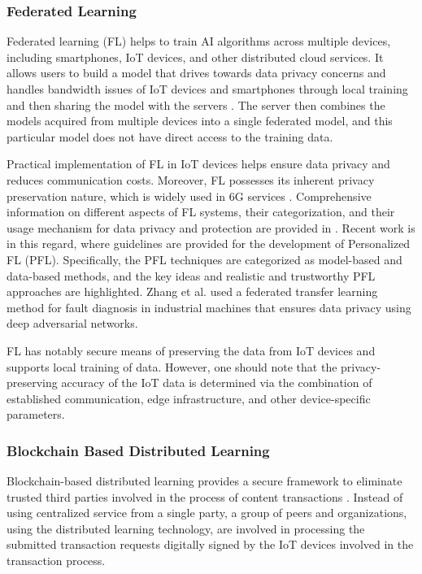 \documentclass[journal]{IEEEtran}
\begin{document}
\subsubsection{Federated Learning} 
Federated learning (FL) helps to train AI algorithms across multiple devices, including smartphones, IoT devices, and other distributed cloud services. It allows users to build a model that drives towards data privacy concerns and handles bandwidth issues of IoT devices and smartphones through local training and then sharing the model with the servers \cite{pham2021uav}. The server then combines the models acquired from multiple devices into a single federated model, and this particular model does not have direct access to the training data. 

Practical implementation of FL in IoT devices helps ensure data privacy and reduces communication costs. Moreover, FL possesses its inherent privacy preservation nature, which is widely used in 6G services \cite{liu2020federated,xiao2020towards}. Comprehensive information on different aspects of FL systems, their categorization, and their usage mechanism for data privacy and protection are provided in \cite{li2019survey}. Recent work is \cite{tan2021towards} in this regard, where guidelines are provided for the development of Personalized FL (PFL). Specifically, the PFL techniques are categorized as model-based and data-based methods, and the key ideas and realistic and trustworthy PFL approaches are highlighted. Zhang et al. \cite{zhang2021federated} used a federated transfer learning method for fault diagnosis in industrial machines that ensures data privacy using deep adversarial networks. 

FL has notably secure means of preserving the data from IoT devices and supports local training of data. However, one should note that the privacy-preserving accuracy of the IoT data is determined via the combination of established communication, edge infrastructure, and other device-specific parameters.    

\subsubsection{Blockchain Based Distributed Learning} 
Blockchain-based distributed learning provides a secure framework to eliminate trusted third parties involved in the process of content transactions \cite{nguyen2021federated}. Instead of using centralized service from a single party,  a group of peers and organizations, using the distributed learning technology, are involved in processing the submitted transaction requests digitally signed by the IoT devices involved in the transaction process. 
\end{document}
